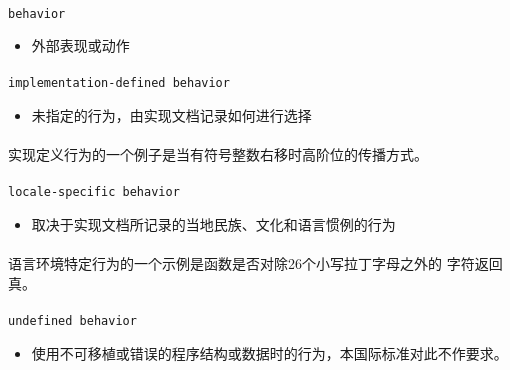 \paragraph{}
\texttt{behavior}
\begin{itemize}
  \item[]{外部表现或动作}
\end{itemize}

\paragraph{}
\texttt{implementation-defined behavior}
\begin{itemize}
  \item[]{未指定的行为，由实现文档记录如何进行选择}
\end{itemize}

\paragraph{}
\ex* 实现定义行为的一个例子是当有符号整数右移时高阶位的传播方式。

\paragraph{}
\texttt{locale-specific behavior}
\begin{itemize}
  \item[]{取决于实现文档所记录的当地民族、文化和语言惯例的行为}
\end{itemize}

\paragraph{}
\ex* 语言环境特定行为的一个示例是函数是否对除26个小写拉丁字母之外的
字符返回真。

\paragraph{}
\texttt{undefined behavior}
\begin{itemize}
  \item[]{使用不可移植或错误的程序结构或数据时的行为，本国际标准对此不作要求。}
\end{itemize}

